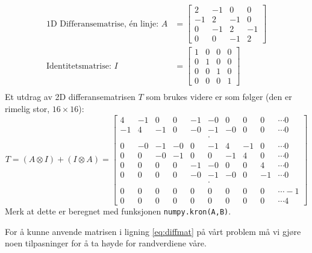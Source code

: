 \begin{align}
   \text{1D Differansematrise, én linje: } A &=
   \begin{bmatrix}
      2 & -1 &  0 &  0 \\
     -1 &  2 & -1 &  0 \\
      0 & -1 &  2 & -1 \\
      0 &  0 & -1 &  2
   \end{bmatrix} \\
   \text{Identitetsmatrise: } I &=
   \begin{bmatrix}
     1 & 0 & 0 & 0 \\
     0 & 1 & 0 & 0 \\
     0 & 0 & 1 & 0 \\
     0 & 0 & 0 & 1
   \end{bmatrix} \\
 \end{align}
Et utdrag av 2D differansematrisen $T$ som brukes videre er som følger (den er rimelig stor, $16\times 16$):
\begin{equation}
  T = (A \otimes I) + (I \otimes A) =
  \begin{bmatrix}
      4 & -1 &  0 &  0 & -1 & -0 &  0 &  0 &  0 & \cdots  0 \\
     -1 &  4 & -1 &  0 & -0 & -1 & -0 &  0 &  0 & \cdots  0 \\
        &    &    &    &    & \cdot &    &    &    &        \\
      0 & -0 & -1 & -0 &  0 & -1 &  4 & -1 &  0 & \cdots  0 \\
      0 &  0 & -0 & -1 &  0 &  0 & -1 &  4 &  0 & \cdots  0 \\
      0 &  0 &  0 &  0 & -1 & -0 &  0 &  0 &  4 & \cdots  0 \\
      0 &  0 &  0 &  0 & -0 & -1 & -0 &  0 & -1 & \cdots  0 \\
        &    &    &    &    & \cdot &    &    &    &        \\
      0 &  0 &  0 &  0 &  0 &  0 &  0 &  0 &  0 & \cdots -1 \\
      0 &  0 &  0 &  0 &  0 &  0 &  0 &  0 &  0 & \cdots  4
  \end{bmatrix}
  \label{eq:diffmat}
\end{equation}
Merk at dette er beregnet med funksjonen \texttt{numpy.kron(A,B)}.

For å kunne anvende matrisen i ligning \eqref{eq:diffmat} på vårt problem må vi gjøre noen tilpasninger for å ta høyde for randverdiene våre.

